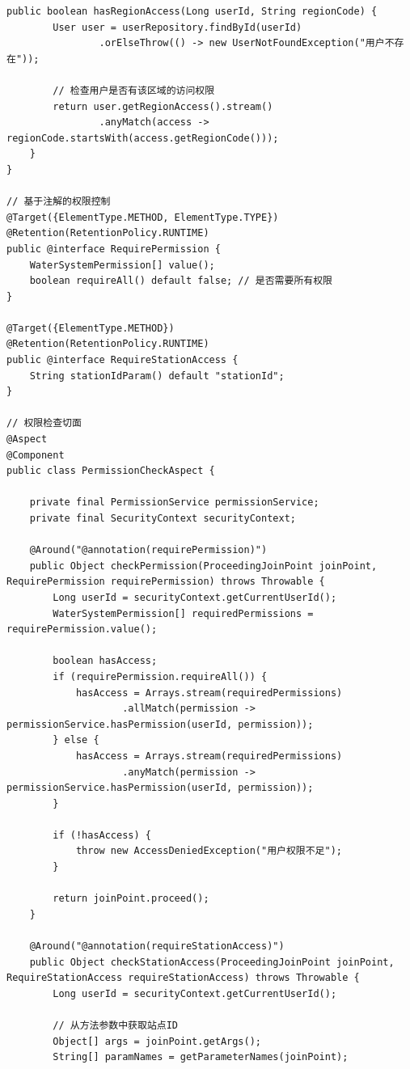 \begin{lstlisting}[style=java]
    public boolean hasRegionAccess(Long userId, String regionCode) {
        User user = userRepository.findById(userId)
                .orElseThrow(() -> new UserNotFoundException("用户不存在"));
                
        // 检查用户是否有该区域的访问权限
        return user.getRegionAccess().stream()
                .anyMatch(access -> regionCode.startsWith(access.getRegionCode()));
    }
}

// 基于注解的权限控制
@Target({ElementType.METHOD, ElementType.TYPE})
@Retention(RetentionPolicy.RUNTIME)
public @interface RequirePermission {
    WaterSystemPermission[] value();
    boolean requireAll() default false; // 是否需要所有权限
}

@Target({ElementType.METHOD})
@Retention(RetentionPolicy.RUNTIME)
public @interface RequireStationAccess {
    String stationIdParam() default "stationId";
}

// 权限检查切面
@Aspect
@Component
public class PermissionCheckAspect {
    
    private final PermissionService permissionService;
    private final SecurityContext securityContext;
    
    @Around("@annotation(requirePermission)")
    public Object checkPermission(ProceedingJoinPoint joinPoint, RequirePermission requirePermission) throws Throwable {
        Long userId = securityContext.getCurrentUserId();
        WaterSystemPermission[] requiredPermissions = requirePermission.value();
        
        boolean hasAccess;
        if (requirePermission.requireAll()) {
            hasAccess = Arrays.stream(requiredPermissions)
                    .allMatch(permission -> permissionService.hasPermission(userId, permission));
        } else {
            hasAccess = Arrays.stream(requiredPermissions)
                    .anyMatch(permission -> permissionService.hasPermission(userId, permission));
        }
        
        if (!hasAccess) {
            throw new AccessDeniedException("用户权限不足");
        }
        
        return joinPoint.proceed();
    }
    
    @Around("@annotation(requireStationAccess)")
    public Object checkStationAccess(ProceedingJoinPoint joinPoint, RequireStationAccess requireStationAccess) throws Throwable {
        Long userId = securityContext.getCurrentUserId();
        
        // 从方法参数中获取站点ID
        Object[] args = joinPoint.getArgs();
        String[] paramNames = getParameterNames(joinPoint);
        

\end{lstlisting}
